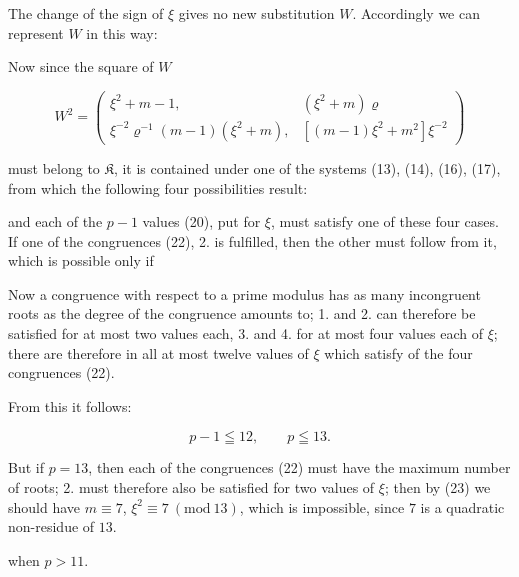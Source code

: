 
 The change of the sign of $\xi$ gives no new substitution $W$. Accordingly we can represent $W$ in this way:


Now since the square of $W$

\[ W^2=\begin{pmatrix}\xi^2+m-1, & (\xi^2+m)\varrho\\ \xi^{-2}\varrho^{-1}(m-1)(\xi^2+m), & [(m-1)\xi^2+m^2]\xi^{-2}\end{pmatrix} \]

must belong to $\mathfrak{K}$, it is contained under one of the systems (13), (14), (16), (17), from which the following four possibilities result:


and each of the $p-1$ values (20), put for $\xi$, must satisfy one of these four cases. If one of the congruences (22), 2. is fulfilled, then the other must follow from it, which is possible only if


Now a congruence with respect to a prime modulus has  as many incongruent roots as the degree of the congruence amounts to; 1. and 2. can therefore be satisfied for at most two values each, 3. and 4. for at most four values each of $\xi$; there are therefore in all at most twelve values of $\xi$ which satisfy  of the four congruences (22).

From this it follows:

\[ p-1\leqq 12,\qquad p\leqq 13. \]

But if $p=13$, then each of the congruences (22) must have the maximum number of roots; 2. must therefore also be satisfied for two values of $\xi$; then by (23) we should have $m\equiv 7$, $\xi^2\equiv 7\ (\mathrm{mod}\ 13)$, which is impossible, since $7$ is a quadratic non-residue of $13$.

 when $p>11$.
